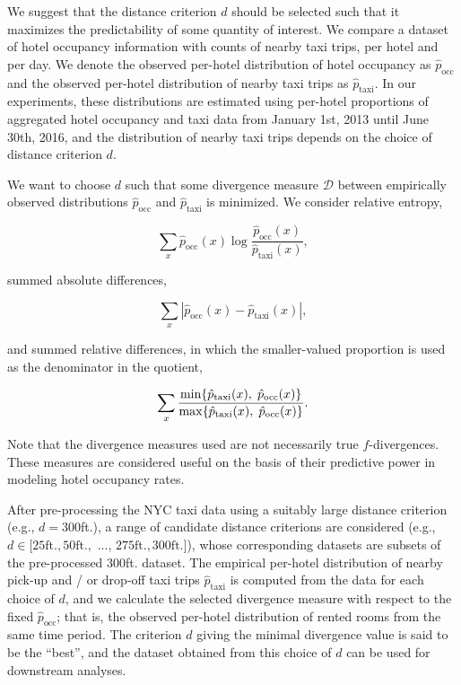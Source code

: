 \documentclass[useAMS, usenatbib]{biom}
\begin{document}
We suggest that the distance criterion $d$ should be selected such that it maximizes the predictability of some quantity of interest. We compare a dataset of hotel occupancy information with counts of nearby taxi trips, per hotel and per day. We denote the observed per-hotel distribution of hotel occupancy as $\hat{p}_{\mathrm{occ}}$ and the observed per-hotel distribution of nearby taxi trips as $\hat{p}_{\mathrm{taxi}}$. In our experiments, these distributions are estimated using per-hotel proportions of aggregated hotel occupancy and taxi data from January 1st, 2013 until June 30th, 2016, and the distribution of nearby taxi trips depends on the choice of distance criterion $d$.

We want to choose $d$ such that some divergence measure $\mathcal{D}$ between empirically observed distributions $\hat{p}_{\mathrm{occ}}$ and $\hat{p}_{\mathrm{taxi}}$ is minimized. We consider relative entropy,

$$\sum_x \hat{p}_{\mathrm{occ}} (x) \log \frac{\hat{p}_{\mathrm{occ}} (x)}{\hat{p}_{\mathrm{taxi}} (x)},$$

summed absolute differences,

$$\sum_x | \hat{p}_{\mathrm{occ}} (x) - \hat{p}_{\mathrm{taxi}} (x) |,$$

and summed relative differences, in which the smaller-valued proportion is used as the denominator in the quotient,

$$\sum_x \frac{\min \{ \hat{p}_{\mathrm{taxi}} (x), \hspace*{0.1cm} \hat{p}_{\mathrm{occ}} (x) \}}{\max \{ \hat{p}_{\mathrm{taxi}} (x), \hspace*{0.1cm} \hat{p}_{\mathrm{occ}} (x) \}}.$$

Note that the divergence measures used are not necessarily true $f$-divergences. These measures are considered useful on the basis of their predictive power in modeling hotel occupancy rates.

After pre-processing the NYC taxi data using a suitably large distance criterion (e.g., $d = 300$ft.), a range of candidate distance criterions are considered (e.g., $d \in [25 \mathrm{ft.}, 50 \mathrm{ft.},$ ..., $275 \mathrm{ft.}, 300 \mathrm{ft.}]$), whose corresponding datasets are subsets of the pre-processed 300ft. dataset. The empirical per-hotel distribution of nearby pick-up and / or drop-off taxi trips $\hat{p}_{\mathrm{taxi}}$ is computed from the data for each choice of $d$, and we calculate the selected divergence measure with respect to the fixed $\hat{p}_{\mathrm{occ}}$; that is, the observed per-hotel distribution of rented rooms from the same time period. The criterion $d$ giving the minimal divergence value is said to be the ``best'', and the dataset obtained from this choice of $d$ can be used for downstream analyses.
\end{document}
